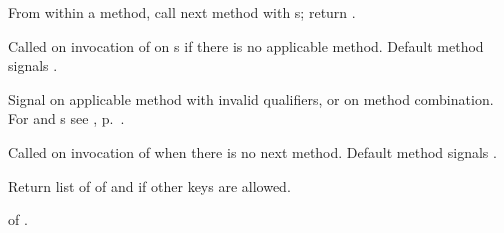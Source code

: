\begin{LIST}{1cm}
  {
    From within a method, call next method with s; return
    .
  }

  {
    Called on invocation of  on s if
    there is no applicable method. Default method signals .
  }

  {
    Signal  on applicable method with invalid qualifiers, or
    on method combination. For  and s see
    , p.\ \pageref{section:Format}.
  }

  {
    Called on invocation of  when there is no next
    method. Default method signals .
  }

  {
    Return list of  of  and
    \retvalii{\T} if other keys are allowed.
  }

  {
     of .
  }


\end{LIST}

